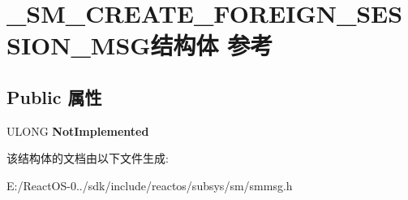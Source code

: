 \hypertarget{struct___s_m___c_r_e_a_t_e___f_o_r_e_i_g_n___s_e_s_s_i_o_n___m_s_g}{}\section{\+\_\+\+S\+M\+\_\+\+C\+R\+E\+A\+T\+E\+\_\+\+F\+O\+R\+E\+I\+G\+N\+\_\+\+S\+E\+S\+S\+I\+O\+N\+\_\+\+M\+S\+G结构体 参考}
\label{struct___s_m___c_r_e_a_t_e___f_o_r_e_i_g_n___s_e_s_s_i_o_n___m_s_g}
\subsection*{Public 属性}
\begin{DoxyCompactItemize}
\item 
\mbox{\label{struct___s_m___c_r_e_a_t_e___f_o_r_e_i_g_n___s_e_s_s_i_o_n___m_s_g_a9fafa078cf17c790e6b2e69c7a5887ba}} 
U\+L\+O\+NG {\bfseries Not\+Implemented}
\end{DoxyCompactItemize}


该结构体的文档由以下文件生成\+:\begin{DoxyCompactItemize}
\item 
E\+:/\+React\+O\+S-\/0../sdk/include/reactos/subsys/sm/smmsg.\+h\end{DoxyCompactItemize}
